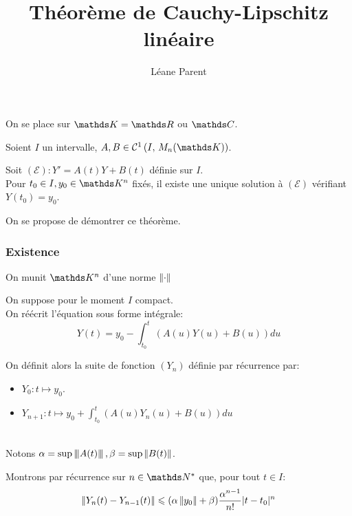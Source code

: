 \documentclass[a4paper, 12pt]{article}
\title{Théorème de Cauchy-Lipschitz linéaire}
\author{Léane Parent}
\begin{document}
	\maketitle
	
	On se place sur $\K = \R$ ou $\C$.
	
	\begin{pr}
		Soient $I$ un intervalle, $A, B \in \Co[1]{I}{M_n(\K)}$.
		
		Soit $ (\mathcal E): Y' = A(t)Y + B(t) $ définie sur $I$. \\
		
		Pour $t_0 \in I, y_0 \in \K^n$ fixés, il existe une unique solution à $(\mathcal E)$ vérifiant $Y(t_0) = y_0$.
	\end{pr}
	
	On se propose de démontrer ce théorème.
	
	\subsubsection*{Existence}
	
	On munit $\K^n$ d'une norme $\norm$
	
	On suppose pour le moment $I$ compact. \\
	
	On réécrit l'équation sous forme intégrale:
	$$ Y(t) = y_0 - \int_{t_0}^t \left(A(u)Y(u) + B(u)\right) du $$
	
	On définit alors la suite de fonction $(Y_n)$ définie par récurrence par:
	\begin{itemize}
		\item $Y_0:t \mapsto y_0$.
		\item $\displaystyle Y_{n+1}: t \mapsto y_0+ \int_{t_0}^t (A(u)Y_n(u) + B(u)) du$
	\end{itemize}
	\hspace{0pt} \\
	
	Notons $\alpha = \sup \triple[A(t)], \beta = \sup\norm[B(t)]$.
	
	Montrons par récurrence sur $n\in\N^*$ que, pour tout $t\in I$:
	$$ \norm[Y_n(t) - Y_{n-1}(t)] \leqslant (\alpha\norm[y_0]+\beta)\frac{\alpha^{n-1}}{n!}|t-t_0|^n$$
	
\end{document}
